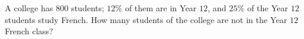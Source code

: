 A college has $800$ students; $12\%$ of them are in Year $12$, and $25\%$ of the Year $12$ students study French. How many students of the college are not in the Year $12$ French class?
